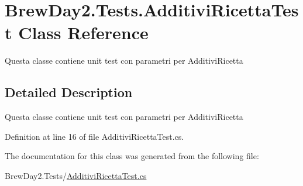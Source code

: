 \hypertarget{class_brew_day2_1_1_tests_1_1_additivi_ricetta_test}{}\section{Brew\+Day2.\+Tests.\+Additivi\+Ricetta\+Test Class Reference}
\label{class_brew_day2_1_1_tests_1_1_additivi_ricetta_test}


Questa classe contiene unit test con parametri per Additivi\+Ricetta 




\subsection{Detailed Description}
Questa classe contiene unit test con parametri per Additivi\+Ricetta



Definition at line 16 of file Additivi\+Ricetta\+Test.\+cs.



The documentation for this class was generated from the following file\+:\begin{DoxyCompactItemize}
\item 
Brew\+Day2.\+Tests/\mbox{\hyperlink{_additivi_ricetta_test_8cs}{Additivi\+Ricetta\+Test.\+cs}}\end{DoxyCompactItemize}
